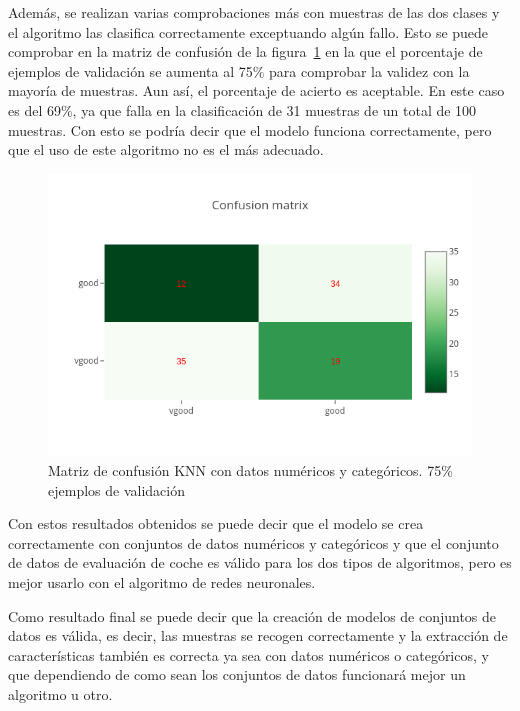 \documentclass[a4paper, 12pt]{book}
\begin{document}
Además, se realizan varias comprobaciones más con muestras de las dos clases y el algoritmo las clasifica correctamente exceptuando algún fallo. Esto se puede comprobar en la matriz de confusión de la figura~\ref{fig:ejemplo26} en la que el porcentaje de ejemplos de validación se aumenta al 75\% para comprobar la validez con la mayoría de muestras. 
Aun así, el porcentaje de acierto es aceptable. En este caso es del 69\%, ya que falla en la clasificación de 31 muestras de un total de 100 muestras. Con esto se podría decir que el modelo funciona correctamente, pero que el uso de este algoritmo no es el más adecuado.

\begin{figure}
	\centering
	\includegraphics[width=12cm, keepaspectratio]{img/cm_numycat_knn2.png}
	\caption{Matriz de confusión KNN con datos numéricos y categóricos. 75\% ejemplos de validación} 	
	\label{fig:ejemplo26}
\end{figure}

Con estos resultados obtenidos se puede decir que el modelo se crea correctamente con conjuntos de datos numéricos y categóricos y que el conjunto de datos de evaluación de coche es válido para los dos tipos de algoritmos, pero es mejor usarlo con el algoritmo de redes neuronales.

Como resultado final se puede decir que la creación de modelos de conjuntos de datos es válida, es decir, las muestras se recogen correctamente y la extracción de características también es correcta ya sea con datos numéricos o categóricos, y que dependiendo de como sean los conjuntos de datos funcionará mejor un algoritmo u otro.




\end{document}
